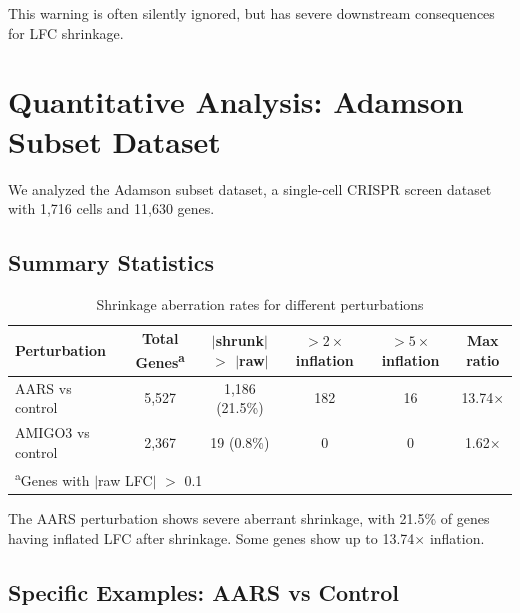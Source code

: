 \documentclass{article}
\begin{document}
This warning is often silently ignored, but has severe downstream consequences for LFC shrinkage.

\section{Quantitative Analysis: Adamson Subset Dataset}

We analyzed the Adamson subset dataset, a single-cell CRISPR screen dataset with 1,716 cells and 11,630 genes.

\subsection{Summary Statistics}

\begin{table}[h]
\centering
\caption{Shrinkage aberration rates for different perturbations}
\label{tab:summary}
\begin{tabular}{lccccc}
\toprule
Perturbation & Total Genes\textsuperscript{a} & $|$shrunk$|$ $>$ $|$raw$|$ & $>2\times$ inflation & $>5\times$ inflation & Max ratio \\
\midrule
AARS vs control  & 5,527 & 1,186 (21.5\%) & 182 & 16 & 13.74$\times$ \\
AMIGO3 vs control & 2,367 & 19 (0.8\%) & 0 & 0 & 1.62$\times$ \\
\bottomrule
\multicolumn{6}{l}{\textsuperscript{a}Genes with $|$raw LFC$|$ $>$ 0.1}
\end{tabular}
\end{table}

The AARS perturbation shows severe aberrant shrinkage, with 21.5\% of genes having inflated LFC after shrinkage. Some genes show up to 13.74$\times$ inflation.

\subsection{Specific Examples: AARS vs Control}
\end{document}
